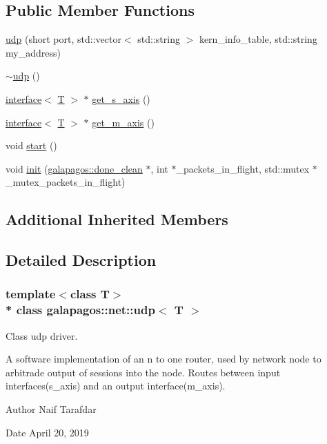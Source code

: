 \subsection*{Public Member Functions}
\begin{DoxyCompactItemize}
\item 
\hyperlink{classgalapagos_1_1net_1_1udp_a86de3f3b1ca57dbb7914062f5424ab6d}{udp} (short port, std\+::vector$<$ std\+::string $>$ kern\+\_\+info\+\_\+table, std\+::string my\+\_\+address)
\item 
\hyperlink{classgalapagos_1_1net_1_1udp_a9f39e94af7950e82bd86a8ae08724132}{$\sim$udp} ()
\item 
\hyperlink{classgalapagos_1_1interface}{interface}$<$ \hyperlink{test_8cpp_a0658ceffa730c765d449bb3d21871b5f}{T} $>$ $\ast$ \hyperlink{classgalapagos_1_1net_1_1udp_aed1c1ca798141a5eb83382b384ede0c1}{get\+\_\+s\+\_\+axis} ()
\item 
\hyperlink{classgalapagos_1_1interface}{interface}$<$ \hyperlink{test_8cpp_a0658ceffa730c765d449bb3d21871b5f}{T} $>$ $\ast$ \hyperlink{classgalapagos_1_1net_1_1udp_a5ab392ec0015391f4428b34463d62d06}{get\+\_\+m\+\_\+axis} ()
\item 
void \hyperlink{classgalapagos_1_1net_1_1udp_acb79ddb76eeb80fbf775cba76f251ac8}{start} ()
\item 
void \hyperlink{classgalapagos_1_1net_1_1udp_a0a071fe7943e7ff4d59640dd39392b50}{init} (\hyperlink{classgalapagos_1_1done__clean}{galapagos\+::done\+\_\+clean} $\ast$, int $\ast$\+\_\+packets\+\_\+in\+\_\+flight, std\+::mutex $\ast$\+\_\+mutex\+\_\+packets\+\_\+in\+\_\+flight)
\end{DoxyCompactItemize}
\subsection*{Additional Inherited Members}


\subsection{Detailed Description}
\subsubsection*{template$<$class T$>$\\*
class galapagos\+::net\+::udp$<$ T $>$}

Class udp driver. 

A software implementation of an n to one router, used by network node to arbitrade output of sessions into the node. Routes between input interfaces(s\+\_\+axis) and an output interface(m\+\_\+axis). \begin{DoxyAuthor}{Author}
Naif Tarafdar 
\end{DoxyAuthor}
\begin{DoxyDate}{Date}
April 20, 2019 
\end{DoxyDate}


